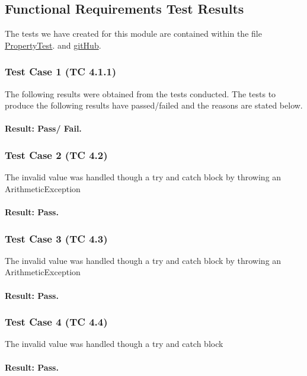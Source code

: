 \documentclass[a4paper,12pt]{article}
\begin{document}
\subsection{Functional Requirements Test Results}
The tests we have created for this module are contained within the file   \href{https://github.com/u13278012/IMPAKD/blob/master/Implementation/PIO/BackEnd/test/Test/PropertyTest.java}{PropertyTest}. and \href{https://github.com/u13278012/IMPAKD/}{gitHub}.

\subsubsection{Test Case 1 (TC 4.1.1)}
The following results were obtained from the tests conducted. The tests to produce the
following results have passed/failed and the reasons are stated below.
\paragraph{Result: Pass/ Fail.}

\subsubsection{Test Case 2 (TC 4.2)}
The invalid value was handled though a try and catch block by throwing an ArithmeticException 

\paragraph{Result: Pass.}
\subsubsection{Test Case 3 (TC 4.3)}
The invalid value was handled though a try and catch block by throwing an ArithmeticException 

\paragraph{Result: Pass.}

\subsubsection{Test Case 4 (TC 4.4)}
The invalid value was handled though a try and catch block 
\paragraph{Result: Pass.}
\end{document}
